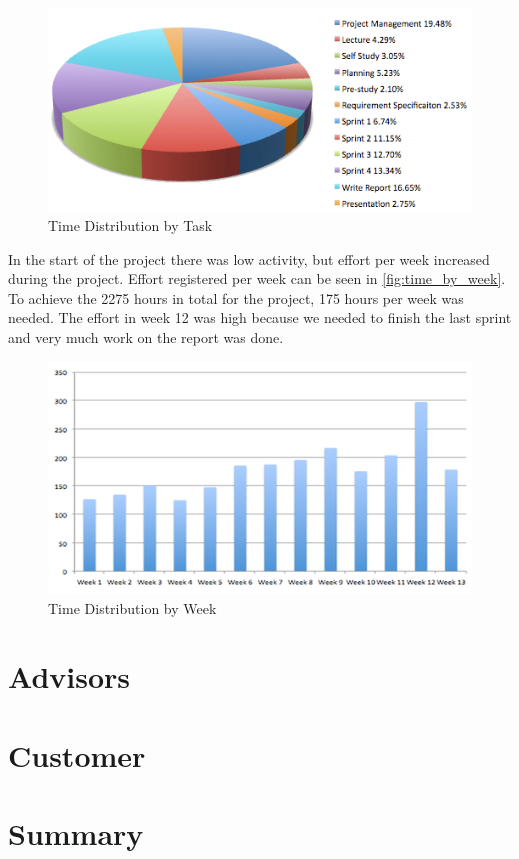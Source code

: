 \begin{figure}[htb]
	\center
	\includegraphics[width=\textwidth]{./evaluation/img/piechart_time}
	\caption{Time Distribution by Task\label{fig:time_by_task}}
\end{figure}

In the start of the project there was low activity, but effort per week 
increased during the project. Effort registered per week can be seen in 
\autoref{fig:time_by_week}. To achieve the 2275 hours in total for the 
project, 175 hours per week was needed. The effort in week 12 was high because 
we needed to finish the last sprint and very much work on the report was done.

\begin{figure}[htb]
	\center
	\includegraphics[width=\textwidth]{./evaluation/img/columnchart_effort} 
	\caption{Time Distribution by Week\label{fig:time_by_week}}
\end{figure}

\section{Advisors}

\section{Customer}

\section{Summary}

